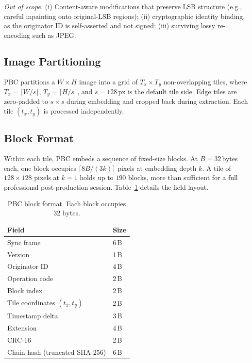 \documentclass[conference]{IEEEtran}
\begin{document}
\emph{Out of scope.} (i) Content-aware modifications that preserve LSB
structure (e.g., careful inpainting onto original-LSB regions);
(ii) cryptographic identity binding, as the originator ID is
self-asserted and not signed; (iii) surviving lossy re-encoding such as
JPEG.

\subsection{Image Partitioning}

PBC partitions a $W \times H$ image into a grid of
$T_x \times T_y$ non-overlapping tiles, where
$T_x = \lceil W / s \rceil$, $T_y = \lceil H / s \rceil$,
and $s = 128$\,px is the default tile side. Edge tiles are zero-padded
to $s \times s$ during embedding and cropped back during extraction.
Each tile $(t_x, t_y)$ is processed independently.

\subsection{Block Format}

Within each tile, PBC embeds a sequence of fixed-size blocks.
At $B = 32$\,bytes each, one block occupies
$\lceil 8B / (3k) \rceil$ pixels at embedding depth $k$.
A tile of $128 \times 128$ pixels at $k{=}1$ holds up to $190$ blocks,
more than sufficient for a full professional post-production session.
Table~\ref{tab:blockformat} details the field layout.

\begin{table}[t]
  \centering
  \caption{PBC block format. Each block occupies 32 bytes.}
  \label{tab:blockformat}
  \begin{tabular}{@{}ll@{}}
    \toprule
    Field & Size \\
    \midrule
    Sync frame                     & 6\,B \\
    Version                        & 1\,B \\
    Originator ID                  & 4\,B \\
    Operation code                 & 2\,B \\
    Block index                    & 2\,B \\
    Tile coordinates $(t_x, t_y)$  & 2\,B \\
    Timestamp delta                & 3\,B \\
    Extension                      & 4\,B \\
    CRC-16                         & 2\,B \\
    Chain hash (truncated SHA-256) & 6\,B \\
    \bottomrule
  \end{tabular}
\end{table}
\end{document}
